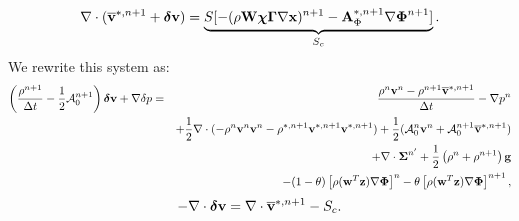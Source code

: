 \documentclass[final]{siamltex}
\def\Ab {{\bf A}}
\def\gb {{\bf g}}
\def\vb {{\bf v}}
\def\wb {{\bf w}}
\def\Wb {{\bf W}}
\def\xb {{\bf x}}
\def\zb {{\bf z}}
\def\chib   {\boldsymbol{\chi}}
\def\deltab {\boldsymbol{\delta}}
\def\Gammab {\boldsymbol{\Gamma}}
\def\Phib   {\boldsymbol{\Phi}}
\def\Sigmab {\boldsymbol{\Sigma}}
\def\half   {\frac{1}{2}}
\begin{document}
\begin{equation}
\nabla\cdot(\overline\vb^{*,n+1} + \deltab\vb) =  \underbrace{S[-(\rho\Wb\chib\Gammab\nabla\xb)^{n+1} - \Ab_\Phi^{*,n+1}\nabla\Phib^{n+1}]}_{S_c}.
\end{equation}
We rewrite this system as:
\begin{eqnarray}
\left(\frac{\rho^{n+1}}{\Delta t} - \half\mathcal{A}_0^{n+1}\right)\deltab\vb + \nabla\delta p &=& \frac{\rho^n\vb^n-\rho^{n+1}\overline\vb^{*,n+1}}{\Delta t} -\nabla p^n\nonumber\\
&&+ \half\nabla\cdot(-\rho^n\vb^n\vb^n - \rho^{*,n+1}\vb^{*,n+1}\vb^{*,n+1}) + \half(\mathcal{A}_0^n\vb^n + \mathcal{A}_0^{n+1}\overline\vb^{*,n+1} )\nonumber\\
&&+ \nabla\cdot\Sigmab^{n'} + \half\left(\rho^n+\rho^{n+1}\right)\gb\nonumber\\
&&- (1-\theta)\left[\rho(\wb^T\zb)\nabla\Phib\right]^n - \theta\left[\rho(\wb^T\zb)\nabla\Phib\right]^{n+1},
\end{eqnarray}
\begin{equation}
-\nabla\cdot\deltab\vb = \nabla\cdot\overline\vb^{*,n+1} - S_c.
\end{equation}


\end{document}
